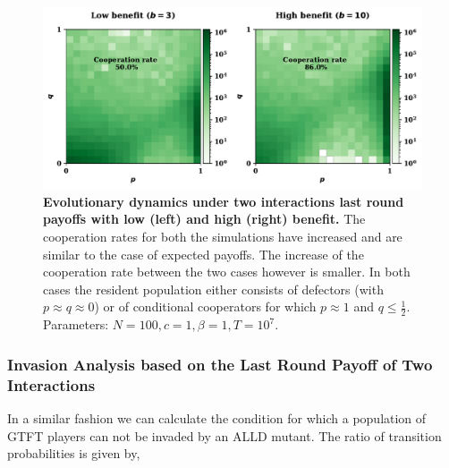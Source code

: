 \documentclass[11pt]{article}
\theoremstyle{plainCl1}
\theoremstyle{plainCl2}
\begin{document}
\begin{figure}[!htbp]
  \centering 
  \includegraphics[width=.70\textwidth]{static/two_interactions_donation_game.pdf}
  \caption{\textbf{Evolutionary dynamics under two interactions last round
  payoffs with low (left) and high (right) benefit.}
  The cooperation rates for both the simulations have increased and are similar
  to the case of expected payoffs. The increase of the cooperation rate between
  the two cases however is smaller. In both cases the resident population
  either consists of defectors (with
  \(p \approx q \approx 0\)) or of conditional cooperators for which \(p \approx
  1\) and \(q \leq \frac{1}{2}\). Parameters: \(N =100, c=1, \beta=1, T=10^{7}\).
  }\label{fig:two_interactions_results}
\end{figure}

\subsubsection*{Invasion Analysis based on the Last Round Payoff of Two Interactions}

In a similar fashion we can calculate the condition for which a population of
GTFT players can not be invaded by an ALLD mutant. The ratio of transition
probabilities is given by,
\end{document}

